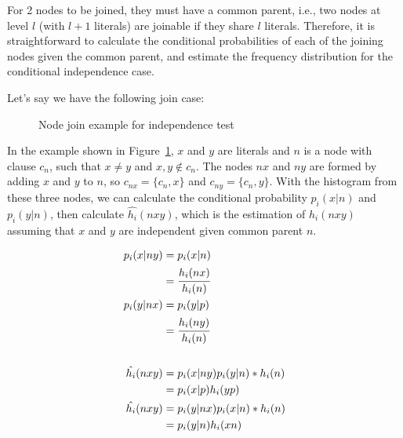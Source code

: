 For 2 nodes to be joined, they must have a common parent, i.e., two nodes at level $l$ (with $l+1$ literals) are
joinable if they share $l$ literals. Therefore, it is straightforward to calculate the conditional probabilities of each
of the joining nodes given the common parent, and estimate the frequency distribution for the conditional independence
case.

Let's say we have the following join case:
 
\begin{figure}[!h]
  \caption{Node join example for independence test}
  \centering
  \label{fig:joinIndepExample}
\end{figure}

In the example shown in Figure~\ref{fig:joinIndepExample}, $x$ and $y$ are literals and $n$ is a node with clause
$c_n$,
such that $x \neq y$ and $x,y \not \in c_n$. The nodes $nx$ and $ny$ are formed by adding $x$ and $y$ to $n$, so
$c_{nx}=\{c_n,x\}$ and $c_{ny}=\{c_n,y\}$. With the histogram from these three nodes, we can calculate the conditional
probability $p_i(x|n)$ and $p_i(y|n)$, then calculate $\hat{h_i}(nxy)$, which is the estimation of
$h_i(nxy)$ assuming that $x$ and $y$ are independent given common parent $n$.

\begin{align*}
\label{eq:condindep}
 p_i(x|ny) &= p_i(x|n) \\ 
 &= \cfrac{h_i(nx)}{h_i(n)} \\ 
 p_i(y|nx) &= p_i(y|p) \\ 
 &= \cfrac{h_i(ny)}{h_i(n)} \\ \\ 
 \hat{h_i}(nxy) &= p_i(x|ny)p_i(y|n)*h_i(n) \\ 
 &= p_i(x|p)h_i(yp) \\ 
 \hat{h_i}(nxy) &= p_i(y|nx)p_i(x|n)*h_i(n) \\ 
 &= p_i(y|n)h_i(xn)
\end{align*}

